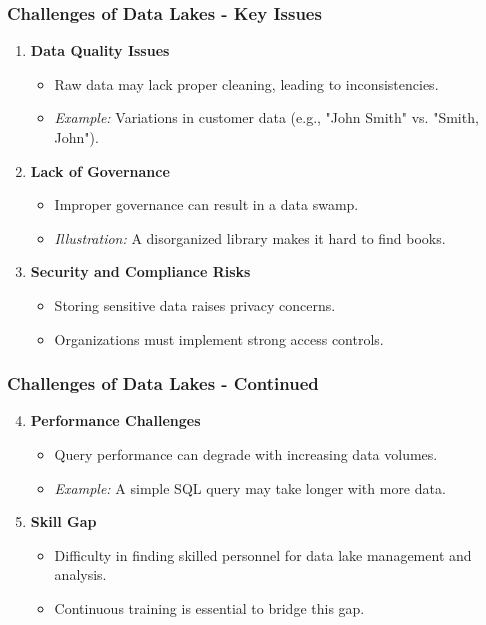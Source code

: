 \documentclass[aspectratio=169]{beamer}
\begin{document}
\begin{frame}[fragile]
    \frametitle{Challenges of Data Lakes - Key Issues}
    \begin{enumerate}
        \item \textbf{Data Quality Issues}
        \begin{itemize}
            \item Raw data may lack proper cleaning, leading to inconsistencies.
            \item \textit{Example:} Variations in customer data (e.g., "John Smith" vs. "Smith, John").
        \end{itemize}

        \item \textbf{Lack of Governance}
        \begin{itemize}
            \item Improper governance can result in a data swamp.
            \item \textit{Illustration:} A disorganized library makes it hard to find books.
        \end{itemize}

        \item \textbf{Security and Compliance Risks}
        \begin{itemize}
            \item Storing sensitive data raises privacy concerns.
            \item Organizations must implement strong access controls.
        \end{itemize}
    \end{enumerate}
\end{frame}

\begin{frame}[fragile]
    \frametitle{Challenges of Data Lakes - Continued}
    \begin{enumerate}
        \setcounter{enumii}{3}
        \item \textbf{Performance Challenges}
        \begin{itemize}
            \item Query performance can degrade with increasing data volumes.
            \item \textit{Example:} A simple SQL query may take longer with more data.
        \end{itemize}

        \item \textbf{Skill Gap}
        \begin{itemize}
            \item Difficulty in finding skilled personnel for data lake management and analysis.
            \item Continuous training is essential to bridge this gap.
        \end{itemize}
    \end{enumerate}
\end{frame}
\end{document}
